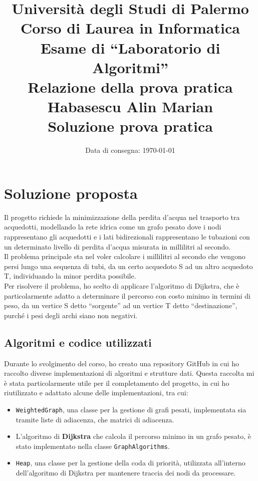 \documentclass[a4paper,12pt]{article}
\title{
    \vspace{-2cm} %
    \textbf{\Large Università degli Studi di Palermo} \\
    \vspace{0.3cm}
    \textbf{\Large Corso di Laurea in Informatica} \\
    \vspace{1cm}
    \textbf{\Large Esame di ``Laboratorio di Algoritmi''} \\
    \vspace{0.5cm}
    \textbf{\Large Relazione della prova pratica} \\
    \vspace{2cm}
    \textbf{Habasescu Alin Marian} \\
    \vspace{0.5cm}
    \textbf{\Large Soluzione prova pratica} \\
    \vspace{1cm}
}
\date{\normalsize Data di consegna: \today} %
\begin{document}
\maketitle %

\tableofcontents %
\clearpage

\section{Soluzione proposta}
Il progetto richiede la minimizzazione della perdita d'acqua nel trasporto tra acquedotti, 
modellando la rete idrica come un grafo pesato dove i nodi rappresentano gli acquedotti 
e i lati bidirezionali rappresentano le tubazioni con un determinato livello di perdita 
d'acqua misurata in millilitri al secondo. \\

Il problema principale sta nel voler calcolare i millilitri al secondo che vengono persi 
lungo una sequenza di tubi, da un certo acquedoto S ad un
altro acquedoto T, individuando la minor perdita possibile.\\

Per risolvere il problema, ho scelto di applicare l'algoritmo di Dijkstra, 
che è particolarmente adatto a determinare il percorso con costo minimo in termini di peso,
da un vertice S detto ``sorgente'' ad un vertice T detto ``destinazione'', 
purché i pesi degli archi siano non negativi.\\

\subsection{Algoritmi e codice utilizzati}
Durante lo svolgimento del corso, ho creato una repository GitHub in cui ho raccolto 
diverse implementazioni di algoritmi e strutture dati. Questa raccolta mi è stata 
particolarmente utile per il completamento del progetto, in cui ho riutilizzato e 
adattato alcune delle implementazioni, tra cui:

\begin{itemize}
    \item \texttt{WeightedGraph}, una classe per la gestione di grafi pesati, 
    implementata sia tramite liste di adiacenza, che matrici di adiacenza.
    \item L'algoritmo di \textbf{Dijkstra} che calcola il percorso minimo in un 
    grafo pesato, è stato implementato nella classe \texttt{GraphAlgorithms}.
    \item \texttt{Heap}, una classe per la gestione della coda di priorità, utilizzata 
    all'interno dell'algoritmo di Dijkstra per mantenere traccia dei nodi da processare.
\end{itemize}
\end{document}
